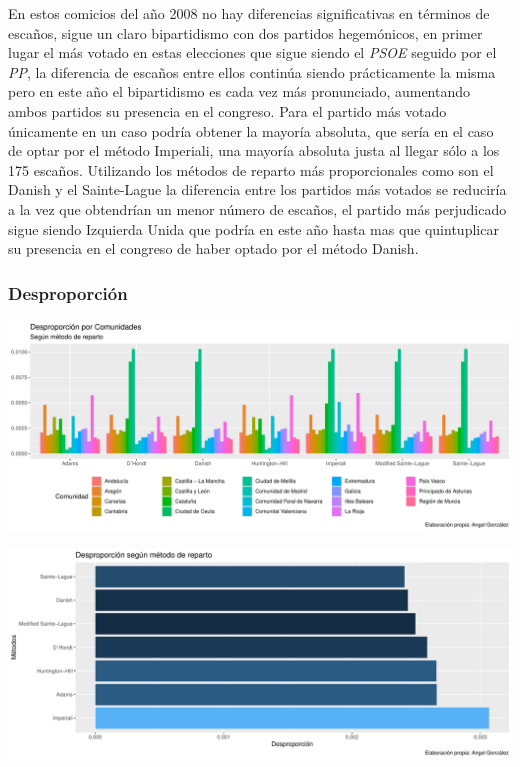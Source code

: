 \documentclass[12pt,a4paper,]{book}
\numberwithin{dummy}{section}
\theoremstyle{ocrenumbox}
\theoremstyle{blacknumex}
\theoremstyle{blacknumbox}
\theoremstyle{ocrenum}
\theoremstyle{ocrenum}
\begin{document}
En estos comicios del año 2008 no hay diferencias significativas en
términos de escaños, sigue un claro bipartidismo con dos partidos
hegemónicos, en primer lugar el más votado en estas elecciones que sigue
siendo el \emph{PSOE} seguido por el \emph{PP}, la diferencia de escaños
entre ellos continúa siendo prácticamente la misma pero en este año el
bipartidismo es cada vez más pronunciado, aumentando ambos partidos su
presencia en el congreso. Para el partido más votado únicamente en un
caso podría obtener la mayoría absoluta, que sería en el caso de optar
por el método Imperiali, una mayoría absoluta justa al llegar sólo a los
175 escaños. Utilizando los métodos de reparto más proporcionales como
son el Danish y el Sainte-Lague la diferencia entre los partidos más
votados se reduciría a la vez que obtendrían un menor número de escaños,
el partido más perjudicado sigue siendo Izquierda Unida que podría en
este año hasta mas que quintuplicar su presencia en el congreso de haber
optado por el método Danish.

\hypertarget{desproporciuxf3n-9}{%
\subsubsection{Desproporción}\label{desproporciuxf3n-9}}

\begin{center}\includegraphics[width=0.95\linewidth]{figurasR/unnamed-chunk-144-1} \end{center}

\begin{center}\includegraphics[width=0.95\linewidth]{figurasR/unnamed-chunk-144-2} \end{center}
\end{document}
